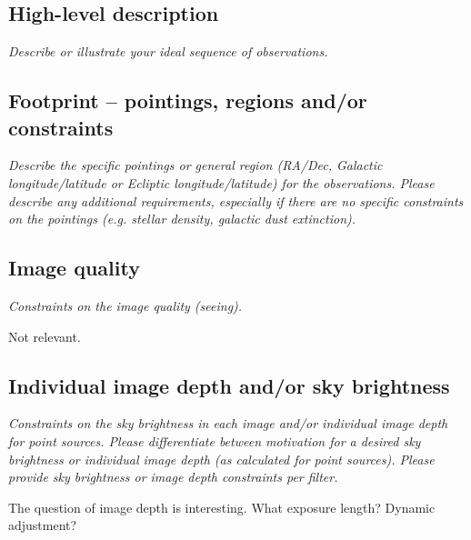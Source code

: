 \documentclass[11pt]{article}
\begin{document}
\subsection{High-level description}
\begin{footnotesize}
{\it Describe or illustrate your ideal sequence of observations.}
\end{footnotesize}

\vspace{.3in}


\subsection{Footprint -- pointings, regions and/or constraints}
\begin{footnotesize}{\it Describe the specific pointings or general region (RA/Dec, Galactic longitude/latitude or 
Ecliptic longitude/latitude) for the observations. Please describe any additional requirements, especially if there
are no specific constraints on the pointings (e.g. stellar density, galactic dust extinction).}
\end{footnotesize}

\subsection{Image quality}
\begin{footnotesize}{\it Constraints on the image quality (seeing).}\end{footnotesize}

Not relevant.

\subsection{Individual image depth and/or sky brightness}
\begin{footnotesize}{\it Constraints on the sky brightness in each image and/or individual image depth for point sources.
Please differentiate between motivation for a desired sky brightness or individual image depth (as 
calculated for point sources). Please provide sky brightness or image depth constraints per filter.}
\end{footnotesize}

The question of image depth is interesting.  What exposure length?
Dynamic adjustment?  
\end{document}

